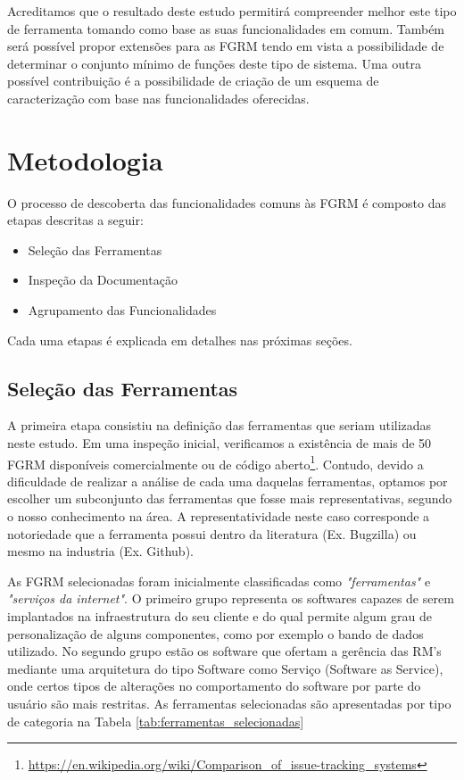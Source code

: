 Acreditamos que o resultado deste estudo permitirá compreender melhor este tipo
de ferramenta tomando como base as suas funcionalidades em comum. Também será
possível propor extensões para as FGRM tendo em vista a possibilidade de
determinar o conjunto mínimo de funções deste tipo de sistema. Uma outra
possível contribuição é a possibilidade de criação de um esquema de
caracterização com base nas funcionalidades oferecidas.

\section{Metodologia}
\label{sec:metodologia}

O processo de descoberta das funcionalidades comuns às FGRM é composto das
etapas descritas a seguir:

\begin{itemize}
	\item Seleção das Ferramentas
	\item Inspeção da Documentação
	\item Agrupamento das Funcionalidades
\end{itemize}

Cada uma etapas é explicada em detalhes nas próximas seções. 

\subsection{Seleção das Ferramentas}
\label{ssub:Seleção das Ferramentas}

A primeira etapa consistiu na definição das ferramentas que seriam utilizadas
neste estudo. Em uma inspeção inicial, verificamos a existência de mais de 50
FGRM disponíveis comercialmente ou de código
aberto\footnote{\url{https://en.wikipedia.org/wiki/Comparison_of_issue-tracking_systems}}.
Contudo, devido a dificuldade de realizar a análise de cada uma daquelas
ferramentas, optamos por escolher um subconjunto das ferramentas que fosse mais
representativas, segundo o nosso conhecimento na área. A representatividade
neste caso corresponde a notoriedade que a ferramenta possui dentro da
literatura (Ex. Bugzilla) ou mesmo na industria (Ex. Github).

As FGRM selecionadas foram inicialmente classificadas como
\textit{"ferramentas"} e \textit{"serviços da internet"}. O primeiro grupo
representa os softwares capazes de serem implantados na infraestrutura do seu
cliente e do qual permite algum grau de personalização de alguns componentes,
como por exemplo o bando de dados utilizado. No segundo grupo estão os software
que ofertam a gerência das RM's mediante uma arquitetura do tipo Software como
Serviço (Software as Service), onde certos tipos de alterações no comportamento
do software por parte do usuário são mais restritas. As ferramentas selecionadas
são apresentadas por tipo de categoria na Tabela
\ref{tab:ferramentas_selecionadas} 

